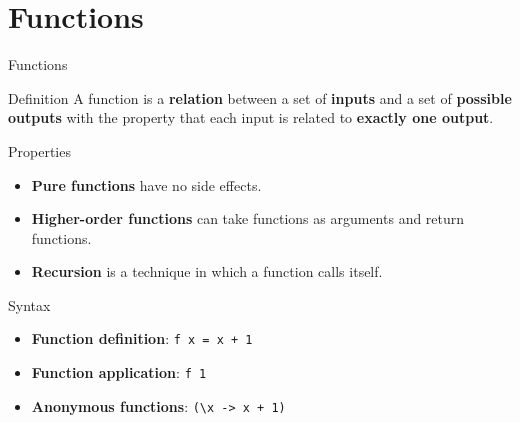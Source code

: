 \section{Functions}
\begin{frame}{Functions}
    \begin{block}{Definition}
        A function is a \textbf{relation} between a set of \textbf{inputs} and a set of \textbf{possible outputs} with the property that each input is related to \textbf{exactly one output}.
    \end{block}
    \begin{block}{Properties}
        \begin{itemize}
            \item \textbf{Pure functions} have no side effects.
            \item \textbf{Higher-order functions} can take functions as arguments and return functions.
            \item \textbf{Recursion} is a technique in which a function calls itself.
        \end{itemize}
    \end{block}
    \begin{block}{Syntax}
        \begin{itemize}
            \item \textbf{Function definition}: \texttt{f x = x + 1}
            \item \textbf{Function application}: \texttt{f 1}
            \item \textbf{Anonymous functions}: \texttt{(\textbackslash x -> x + 1)}
        \end{itemize}
    \end{block}
\end{frame}